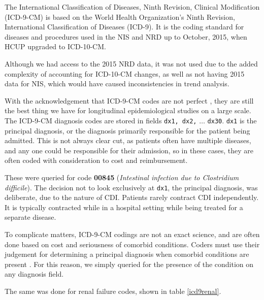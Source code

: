 \documentclass[12pt]{ociamthesis}\usepackage[]{graphicx}\usepackage[]{color}
\begin{document}
The International Classification of Diseases, Ninth Revision, Clinical Modification (ICD-9-CM) is based on the World Health Organization's Ninth Revision,
International Classification of Diseases (ICD-9). It is the coding standard for diseases and procedures used in the NIS and NRD up to October, 2015, when
HCUP upgraded to ICD-10-CM. 

Although we had access to the 2015 NRD data, it was not used due to the added complexity of accounting for ICD-10-CM changes, as well as not having 2015
data for NIS, which would have caused inconsistencies in trend analysis. 

With the acknowledgement that ICD-9-CM codes are not perfect \cite{Uchiyama2015}, they are still the best thing we have for longitudinal 
epidemiological studies on a large scale. The ICD-9-CM diagnosis codes are stored in  fields \texttt{dx1, dx2,} $\hdots$ \texttt{dx30}.
\texttt{dx1} is the principal diagnosis, or the diagnosis primarily responsible for the patient being admitted. This is not always clear cut,
as patients often have multiple diseases, and any one could be responsible for their admission, so in these cases, they are often
coded with consideration to cost and reimbursement. 

These were queried for code \textbf{00845} (\textit{Intestinal infection due to Clostridium difficile}). 
The decision not to look exclusively at \texttt{dx1}, the principal diagnosis, was deliberate, due to the nature of CDI. Patients rarely contract CDI
independently. It is typically contracted while in a hospital setting while being treated for a separate disease. 

To complicate matters, ICD-9-CM codings are not an exact science, and are often done based on cost and seriousness of comorbid conditions. Coders must use
their judgement for determining a principal diagnosis when comorbid conditions are present \cite{Avery2011}. For this reason, we simply queried for
the presence of the condition on any diagnosis field. 

The same was done for renal failure codes, shown in table \ref{icd9renal}. 
\end{document}
